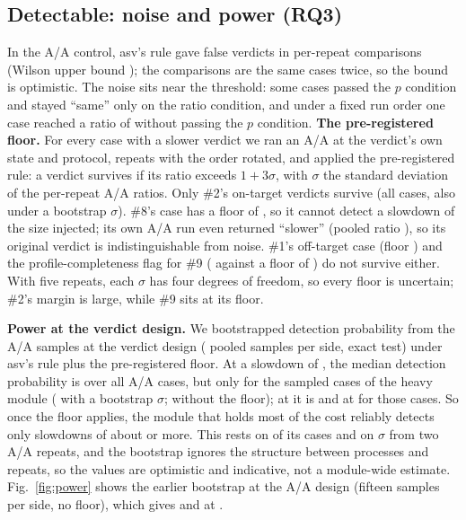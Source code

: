 \subsection{Detectable: noise and power (RQ3)}
\label{sec:rq3}

In the A/A control, asv's rule gave \AAFalse{} false verdicts in \AAComparisons{} per-repeat comparisons (Wilson upper bound \AAUpper\pct); the \AAComparisons{} comparisons are the same \AACases{} cases twice, so the bound is optimistic.
The noise sits near the threshold: some cases passed the $p$ condition and stayed ``same'' only on the ratio condition, and under a fixed run order one case reached a ratio of \AAMaxSameRatio{} without passing the $p$ condition.
\textbf{The pre-registered floor.} For every case with a slower verdict we ran an A/A at the verdict's own state and protocol, \SigmaRepeats{} repeats with the order rotated, and applied the pre-registered rule: a verdict survives if its ratio exceeds $1+3\sigma$, with $\sigma$ the standard deviation of the per-repeat A/A ratios.
Only \#2's on-target verdicts survive (all \SlowTwoCases{} cases, also under a bootstrap $\sigma$).
\#8's case has a floor of \FloorEight, so it cannot detect a slowdown of the size injected; its own A/A run even returned ``slower'' (pooled ratio \EightAAPooled), so its original verdict is indistinguishable from noise.
\#1's off-target case (floor \FloorOne) and the profile-completeness flag for \#9 (\SlowNineRatio\x{} against a floor of \FloorNine) do not survive either.
With five repeats, each $\sigma$ has four degrees of freedom, so every floor is uncertain; \#2's margin is large, while \#9 sits at its floor.

\textbf{Power at the verdict design.} We bootstrapped detection probability from the A/A samples at the verdict design (\VerdictSamples{} pooled samples per side, exact test) under asv's rule plus the pre-registered floor.
At a slowdown of \PowFactorMid\x, the median detection probability is \PowDesignAllMid{} over all A/A cases, but only \PowDesignAlgoMid{} for the \AAAlgoCases{} sampled cases of the heavy module (\PowDesignAlgoMidBoot{} with a bootstrap $\sigma$; \PowDesignAlgoMidNoFloor{} without the floor); at \PowFactorOneFive\x{} it is \PowDesignAlgoOneFive{} and at \PowFactorHigh\x{} \PowDesignAlgoTwo{} for those cases.
So once the floor applies, the module that holds most of the cost reliably detects only slowdowns of about \PowFactorOneFive\x{} or more.
This rests on \AAAlgoCases{} of its \NxAlgoCases{} cases and on $\sigma$ from two A/A repeats, and the bootstrap ignores the structure between processes and repeats, so the values are optimistic and indicative, not a module-wide estimate.
Fig.~\ref{fig:power} shows the earlier bootstrap at the A/A design (fifteen samples per side, no floor), which gives \PowAllOneTwo{} and \PowAlgoOneTwo{} at \PowFactorMid.

